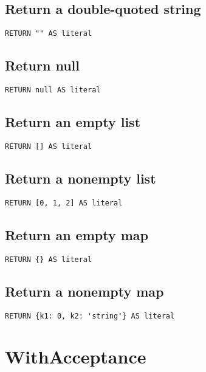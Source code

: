 \subsection{Return a double-quoted string}

\begin{lstlisting}
RETURN "" AS literal
\end{lstlisting}

\subsection{Return null}

\begin{lstlisting}
RETURN null AS literal
\end{lstlisting}

\subsection{Return an empty list}

\begin{lstlisting}
RETURN [] AS literal
\end{lstlisting}

\subsection{Return a nonempty list}

\begin{lstlisting}
RETURN [0, 1, 2] AS literal
\end{lstlisting}

\subsection{Return an empty map}

\begin{lstlisting}
RETURN {} AS literal
\end{lstlisting}

\subsection{Return a nonempty map}

\begin{lstlisting}
RETURN {k1: 0, k2: 'string'} AS literal
\end{lstlisting}
\section{WithAcceptance}


